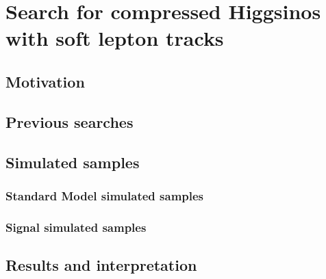 \chapter{Search for compressed Higgsinos  with soft lepton tracks}

\section{Motivation}

\section{Previous searches}




\section{Simulated samples}
\subsection{Standard Model simulated samples}
\label{sec:sm-mc}
\subsection{Signal simulated samples}
\label{sec:signal-simulation}

















\clearpage
\section{Results and interpretation}


